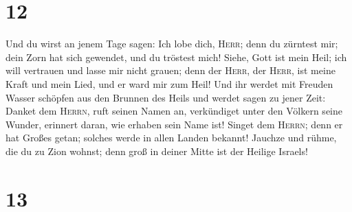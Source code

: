 \hypertarget{section-11}{%
\section{12}\label{section-11}}

 Und du wirst an jenem Tage sagen: Ich lobe dich,
\textsc{Herr}; denn du zürntest mir; dein Zorn hat sich gewendet, und du
tröstest mich!  Siehe, Gott ist mein Heil; ich will
vertrauen und lasse mir nicht grauen; denn der \textsc{Herr}, der
\textsc{Herr}, ist meine Kraft und mein Lied, und er ward mir zum Heil!
 Und ihr werdet mit Freuden Wasser schöpfen aus den
Brunnen des Heils  und werdet sagen zu jener Zeit: Danket
dem \textsc{Herrn}, ruft seinen Namen an, verkündiget unter den Völkern
seine Wunder, erinnert daran, wie erhaben sein Name ist! 
Singet dem \textsc{Herrn}; denn er hat Großes getan; solches werde in
allen Landen bekannt!  Jauchze und rühme, die du zu Zion
wohnst; denn groß in deiner Mitte ist der Heilige Israels!

\hypertarget{section-12}{%
\section{13}\label{section-12}}


